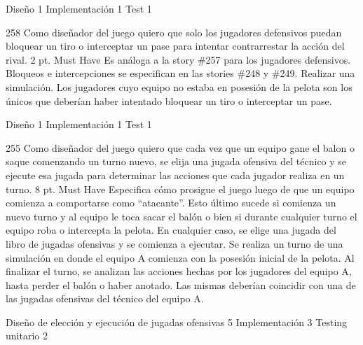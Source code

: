 \begin{taskstable}
 \task
 {Diseño}
 {1}
 \task
 {Implementación}
 {1}
 \task
 {Test}
 {1}
\end{taskstable}

\vspace{1cm}
	

\sprintstory
{258}
{Como diseñador del juego quiero que solo los jugadores defensivos puedan bloquear un tiro o interceptar un pase para intentar contrarrestar la acción del rival.}
{2 pt.}
{Must Have}
{Es análoga a la story \#257 para los jugadores defensivos. Bloqueos e intercepciones se especifican en las stories \#248 y \#249.}
{Realizar una simulación. Los jugadores cuyo equipo no estaba en posesión de la pelota son los únicos que deberían haber intentado bloquear un tiro o interceptar un pase.}

\begin{taskstable}
 \task
 {Diseño}
 {1}
 \task
 {Implementación}
 {1}
 \task
 {Test}
 {1}
\end{taskstable}

\vspace{1cm}


\sprintstory
{255}
{Como diseñador del juego quiero que cada vez que un equipo gane el balon o saque comenzando un turno nuevo, se elija una jugada ofensiva del técnico y se ejecute esa jugada para determinar las acciones que cada jugador realiza en un turno.}
{8 pt.}
{Must Have}
{Especifica cómo prosigue el juego luego de que un equipo comienza a comportarse como ``atacante''. Esto último sucede si comienza un nuevo turno
y al equipo le toca sacar el balón o bien si durante cualquier turno el equipo roba o intercepta la pelota. En cualquier caso, se elige una jugada
del libro de jugadas ofensivas y se comienza a ejecutar.}
{Se realiza un turno de una simulación en donde el equipo A comienza con la posesión inicial de la pelota. Al finalizar el turno, se analizan las acciones
hechas por los jugadores del equipo A, hasta perder el balón o haber anotado. Las mismas deberían coincidir con una de las jugadas ofensivas del técnico del equipo A. }

\begin{taskstable}
 \task
 {Diseño de elección y ejecución de jugadas ofensivas}
 {5}
 \task
 {Implementación}
 {3}
 \task
 {Testing unitario}
 {2}
\end{taskstable}

